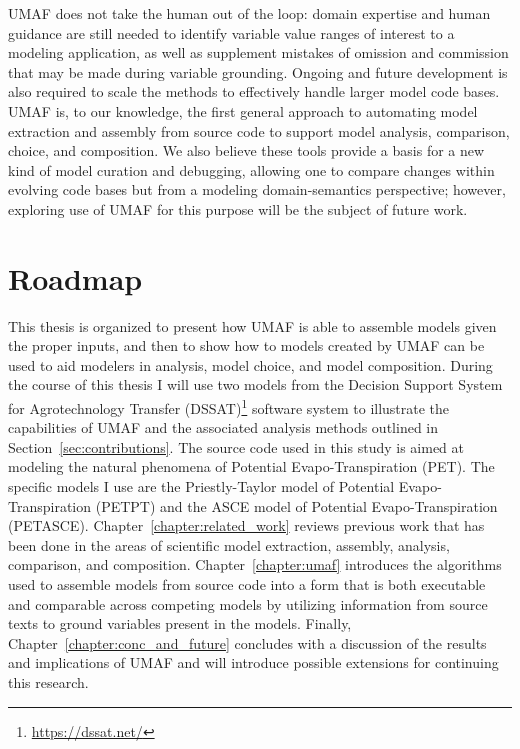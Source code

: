 UMAF does not take the human out of the loop: domain expertise and human guidance are still needed to identify variable value ranges of interest to a modeling application, as well as supplement mistakes of omission and commission that may be made during variable grounding.
Ongoing and future development is also required to scale the methods to effectively handle larger model code bases.
UMAF is, to our knowledge, the first general approach to automating model extraction and assembly from source code to support model analysis, comparison, choice, and composition.
We also believe these tools provide a basis for a new kind of model curation and debugging, allowing one to compare changes within evolving code bases but from a modeling domain-semantics perspective; however, exploring use of UMAF for this purpose will be the subject of future work.

\section{Roadmap\label{sec:roadmap}}
This thesis is organized to present how UMAF is able to assemble models given the proper inputs, and then to show how to models created by UMAF can be used to aid modelers in analysis, model choice, and model composition.
During the course of this thesis I will use two models from the Decision Support System for Agrotechnology Transfer (DSSAT)\footnote{\url{https://dssat.net/}} software system \citep{DSSAT} to illustrate the capabilities of UMAF and the associated analysis methods outlined in Section~\ref{sec:contributions}.
The source code used in this study is aimed at modeling the natural phenomena of Potential Evapo-Transpiration (PET).
The specific models I use are the Priestly-Taylor model of Potential Evapo-Transpiration (PETPT) and the ASCE model of Potential Evapo-Transpiration (PETASCE).
Chapter~\ref{chapter:related_work} reviews previous work that has been done in the areas of scientific model extraction, assembly, analysis, comparison, and composition.
Chapter~\ref{chapter:umaf} introduces the algorithms used to assemble models from source code into a form that is both executable and comparable across competing models by utilizing information from source texts to ground variables present in the models.
Finally, Chapter~\ref{chapter:conc_and_future} concludes with a discussion of the results and implications of UMAF and will introduce possible extensions for continuing this research.
